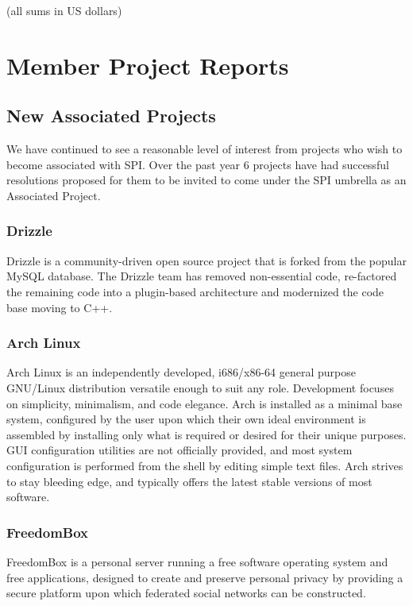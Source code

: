 \documentclass[letterpaper]{report}
\begin{document}
(all sums in US dollars)


\chapter{Member Project Reports}

\section{New Associated Projects}

We have continued to see a reasonable level of interest from projects who wish
to become associated with SPI. Over the past year 6 projects have had
successful resolutions proposed for them to be invited to come under the SPI
umbrella as an Associated Project.


\subsection{Drizzle}

Drizzle is a community-driven open source project that is forked from the
popular MySQL database. The Drizzle team has removed non-essential code,
re-factored the remaining code into a plugin-based architecture and modernized
the code base moving to C++.


\subsection{Arch Linux}

Arch Linux is an independently developed, i686/x86-64 general purpose GNU/Linux
distribution versatile enough to suit any role. Development focuses on
simplicity, minimalism, and code elegance. Arch is installed as a minimal base
system, configured by the user upon which their own ideal environment is
assembled by installing only what is required or desired for their unique
purposes. GUI configuration utilities are not officially provided, and most
system configuration is performed from the shell by editing simple text files.
Arch strives to stay bleeding edge, and typically offers the latest stable
versions of most software.


\subsection{FreedomBox}

FreedomBox is a personal server running a free software operating system and
free applications, designed to create and preserve personal privacy by
providing a secure platform upon which federated social networks can be
constructed.
\end{document}

